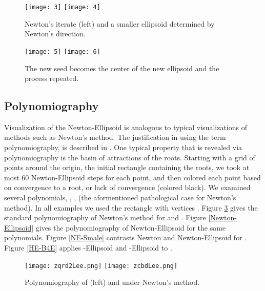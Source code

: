 \documentclass{article}
\begin{document}
\begin{figure}
\begin{center}
\texttt{[image: 3]}
\texttt{[image: 4]}\\
\end{center}
\begin{center}
\caption{Newton's iterate  (left) and a smaller ellipsoid determined by Newton's direction.} \label{Fig2}
\end{center}
\end{figure}

\begin{figure}
\begin{center}
\texttt{[image: 5]}
\texttt{[image: 6]}\\
\end{center}
\begin{center}
\caption{The new seed becomes the center of the new ellipsoid and the process repeated.} \label{Fig3}
\end{center}
\end{figure}





\subsection{Polynomiography}
Visualization of the Newton-Ellipsoid is analogous to typical visualizations of methods such as Newton's method.  The justification in using the term polynomiography, is described in \cite{kalbook}. One typical property that is revealed via polynomiography is the basin of attractions of the roots. Starting with a grid of points around the origin, the initial rectangle  containing the roots,  we took at most  60 Newton-Ellipsoid steps for each point, and then colored each point based on convergence to a root,
or lack of convergence (colored black). We examined several polynomials, , ,  (the aformentioned pathological case for Newton's method). In all examples we used the rectangle with vertices . Figure \ref{FigNewton} gives the standard polynomiography of Newton's method for  and . Figure \ref{Newton-Ellipsoid} gives the polynomiography of Newton-Ellipsoid for the same polynomials.  Figure \ref{NE-Smale} contrasts Newton and Newton-Ellipsoid  for .
Figure \ref{HE-B4E} applies -Ellipsoid and -Ellipsoid to .

\begin{figure}[h!]
\centering
\texttt{[image: zqrd2Lee.png]}
\texttt{[image: zcbdLee.png]}
\caption{Polynomiography of  (left) and  under Newton's method.} \label{FigNewton}
\end{figure}
\end{document}
